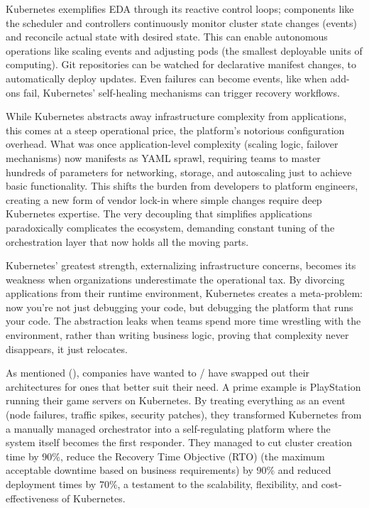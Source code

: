 \documentclass[]{final}
\begin{document}

Kubernetes exemplifies EDA through its reactive control loops; components like
the scheduler and controllers continuously monitor cluster state changes
(events) and reconcile actual state with desired state. This can enable
autonomous operations like scaling events and adjusting pods (the smallest
deployable units of computing). Git repositories can be watched for declarative
manifest changes, to automatically deploy updates. Even failures can become
events, like when add-ons fail, Kubernetes' self-healing mechanisms
can trigger recovery workflows.

While Kubernetes abstracts away infrastructure complexity from applications,
this comes at a steep operational price, the platform's notorious configuration
overhead. What was once application-level complexity (scaling logic, failover
mechanisms) now manifests as YAML sprawl, requiring teams to master hundreds of
parameters for networking, storage, and autoscaling just to achieve basic
functionality. This shifts the burden from developers to platform engineers,
creating a new form of vendor lock-in where simple changes require deep
Kubernetes expertise. The very decoupling that simplifies applications
paradoxically complicates the ecosystem, demanding constant tuning of the
orchestration layer that now holds all the moving parts.

Kubernetes' greatest strength, externalizing infrastructure concerns, becomes
its weakness when organizations underestimate the operational tax. By
divorcing applications from their runtime environment, Kubernetes creates a
meta-problem: now you're not just debugging your code, but debugging the
platform that runs your code. The abstraction leaks when teams spend more time
wrestling with the environment, rather than writing business logic, proving that
complexity never disappears, it just relocates.

As mentioned {\hypersetup{linkcolor=teal}(\pageref{rationale})}, companies have
wanted to / have swapped out their architectures
for ones that better suit their need. A prime example is PlayStation running
their game servers on Kubernetes. By treating everything as an event (node failures, traffic spikes, security
patches), they transformed Kubernetes from a manually managed orchestrator
into a self-regulating platform where the system itself becomes the first
responder. They managed to cut cluster creation time by
90\%, reduce the Recovery Time Objective (RTO) (the maximum acceptable downtime
based on business requirements) by 90\% and reduced deployment times by 70\%,
a testament to the scalability, flexibility, and cost-effectiveness of Kubernetes.
\end{document}
